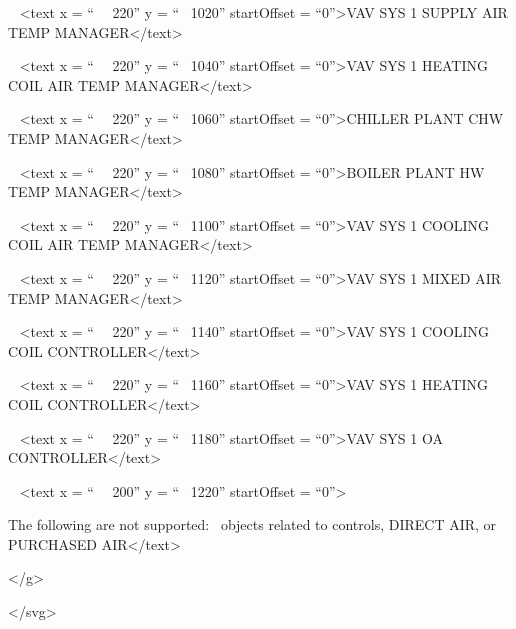 ~ \textless{}text x = ``~~ 220'' y = ``~ 1020'' startOffset = ``0''\textgreater{}VAV SYS 1 SUPPLY AIR TEMP MANAGER\textless{}/text\textgreater{}

~ \textless{}text x = ``~~ 220'' y = ``~ 1040'' startOffset = ``0''\textgreater{}VAV SYS 1 HEATING COIL AIR TEMP MANAGER\textless{}/text\textgreater{}

~ \textless{}text x = ``~~ 220'' y = ``~ 1060'' startOffset = ``0''\textgreater{}CHILLER PLANT CHW TEMP MANAGER\textless{}/text\textgreater{}

~ \textless{}text x = ``~~ 220'' y = ``~ 1080'' startOffset = ``0''\textgreater{}BOILER PLANT HW TEMP MANAGER\textless{}/text\textgreater{}

~ \textless{}text x = ``~~ 220'' y = ``~ 1100'' startOffset = ``0''\textgreater{}VAV SYS 1 COOLING COIL AIR TEMP MANAGER\textless{}/text\textgreater{}

~ \textless{}text x = ``~~ 220'' y = ``~ 1120'' startOffset = ``0''\textgreater{}VAV SYS 1 MIXED AIR TEMP MANAGER\textless{}/text\textgreater{}

~ \textless{}text x = ``~~ 220'' y = ``~ 1140'' startOffset = ``0''\textgreater{}VAV SYS 1 COOLING COIL CONTROLLER\textless{}/text\textgreater{}

~ \textless{}text x = ``~~ 220'' y = ``~ 1160'' startOffset = ``0''\textgreater{}VAV SYS 1 HEATING COIL CONTROLLER\textless{}/text\textgreater{}

~ \textless{}text x = ``~~ 220'' y = ``~ 1180'' startOffset = ``0''\textgreater{}VAV SYS 1 OA CONTROLLER\textless{}/text\textgreater{}

~ \textless{}text x = ``~~ 200'' y = ``~ 1220'' startOffset = ``0''\textgreater{}

The following are not supported:~ objects related to controls, DIRECT AIR, or~ PURCHASED AIR\textless{}/text\textgreater{}

\textless{}/g\textgreater{}

\textless{}/svg\textgreater{}
